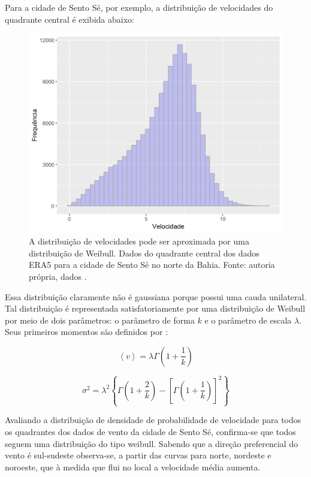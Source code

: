 \documentclass[
	12pt,				%
	openright,			%
	oneside,			%
	a4paper,			%
	english,			%
	french,				%
	spanish,			%
	brazil				%
	]{abntex2}
\begin{document}
Para a cidade de Sento Sé, por exemplo, a distribuição de velocidades do quadrante central é exibida abaixo:

\begin{figure}[h]
    \centering
	\includegraphics[scale=0.8]{weibull_histogram}
	\caption{A distribuição de velocidades pode ser aproximada por uma distribuição de Weibull. Dados do quadrante central dos dados ERA5 \cite{era5} para a cidade de Sento Sé no norte da Bahia. Fonte: autoria própria, dados \cite{era5}.}
\end{figure}
\FloatBarrier

Essa distribuição claramente não é gaussiana porque possui uma cauda unilateral. Tal distribuição é representada satisfatoriamente por uma distribuição de Weibull por meio de dois parâmetros: o parâmetro de forma $k$ e o parâmetro de escala $\lambda$. Seus primeiros momentos são definidos por \cite{weibull}:

\begin{equation}
	\left<v\right> = \lambda\Gamma\left(1+\frac{1}{k}\right)
\end{equation}

\begin{equation}
	\sigma^2 = \lambda^2\left\{\Gamma\left(1+\frac{2}{k}\right)-\left[\Gamma\left(1+\frac{1}{k}\right)\right]^2\right\}
\end{equation}

Avaliando a distribuição de densidade de probabilidade de velocidade para todos os quadrantes dos dados de vento da cidade de Sento Sé, confirma-se que todos seguem uma distribuição do tipo weibull. Sabendo que a direção preferencial do vento é sul-sudeste observa-se, a partir das curvas para norte, nordeste e noroeste, que à medida que flui no local a velocidade média aumenta.
\end{document}
